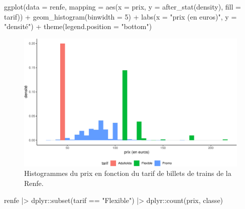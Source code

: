 \documentclass[
  11pt,
  letterpaper,
]{book}
\newenvironment{Shaded}{\begin{snugshade}}{\end{snugshade}}
\newcommand{\AttributeTok}[1]{\textcolor[rgb]{0.40,0.45,0.13}{#1}}
\newcommand{\DecValTok}[1]{\textcolor[rgb]{0.68,0.00,0.00}{#1}}
\newcommand{\FunctionTok}[1]{\textcolor[rgb]{0.28,0.35,0.67}{#1}}
\newcommand{\NormalTok}[1]{\textcolor[rgb]{0.00,0.23,0.31}{#1}}
\newcommand{\SpecialCharTok}[1]{\textcolor[rgb]{0.37,0.37,0.37}{#1}}
\newcommand{\StringTok}[1]{\textcolor[rgb]{0.13,0.47,0.30}{#1}}
\theoremstyle{definition}
\theoremstyle{remark}
\begin{document}
\begin{Shaded}
\begin{Highlighting}[]
\FunctionTok{ggplot}\NormalTok{(}\AttributeTok{data =}\NormalTok{ renfe, }
       \AttributeTok{mapping =} \FunctionTok{aes}\NormalTok{(}\AttributeTok{x =}\NormalTok{ prix, }
                     \AttributeTok{y =} \FunctionTok{after\_stat}\NormalTok{(density), }
                     \AttributeTok{fill =}\NormalTok{ tarif)) }\SpecialCharTok{+}
    \FunctionTok{geom\_histogram}\NormalTok{(}\AttributeTok{binwidth =} \DecValTok{5}\NormalTok{) }\SpecialCharTok{+}
    \FunctionTok{labs}\NormalTok{(}\AttributeTok{x =} \StringTok{"prix (en euros)"}\NormalTok{, }
         \AttributeTok{y =} \StringTok{"densité"}\NormalTok{) }\SpecialCharTok{+} 
    \FunctionTok{theme}\NormalTok{(}\AttributeTok{legend.position =} \StringTok{"bottom"}\NormalTok{)}
\end{Highlighting}
\end{Shaded}

\begin{figure}[ht!]

{\centering \includegraphics[width=1\textwidth,height=\textheight]{./01-analyseexploratoire_files/figure-pdf/fig-renfe-aed7-1.pdf}

}

\caption{\label{fig-renfe-aed7}Histogrammes du prix en fonction du tarif
de billets de trains de la Renfe.}

\end{figure}

\begin{Shaded}
\begin{Highlighting}[]
\NormalTok{renfe }\SpecialCharTok{|\textgreater{}}
\NormalTok{  dplyr}\SpecialCharTok{::}\FunctionTok{subset}\NormalTok{(tarif  }\SpecialCharTok{==} \StringTok{"Flexible"}\NormalTok{) }\SpecialCharTok{|\textgreater{}}
\NormalTok{  dplyr}\SpecialCharTok{::}\FunctionTok{count}\NormalTok{(prix, classe)}
\end{Highlighting}
\end{Shaded}
\end{document}
